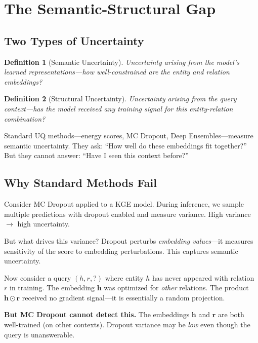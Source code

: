 \documentclass{article}
\newtheorem{definition}{Definition}
\begin{document}
\section{The Semantic-Structural Gap}
\label{sec:gap}

\subsection{Two Types of Uncertainty}

\begin{definition}[Semantic Uncertainty]
Uncertainty arising from the model's learned representations---how well-constrained are the entity and relation embeddings?
\end{definition}

\begin{definition}[Structural Uncertainty]
Uncertainty arising from the query context---has the model received \emph{any} training signal for this entity-relation combination?
\end{definition}

Standard UQ methods---energy scores, MC Dropout, Deep Ensembles---measure semantic uncertainty. They ask: ``How well do these embeddings fit together?'' But they cannot answer: ``Have I seen this context before?''

\subsection{Why Standard Methods Fail}

Consider MC Dropout applied to a KGE model. During inference, we sample multiple predictions with dropout enabled and measure variance. High variance $\rightarrow$ high uncertainty.

But what drives this variance? Dropout perturbs \emph{embedding values}---it measures sensitivity of the score to embedding perturbations. This captures semantic uncertainty.

Now consider a query $(h, r, ?)$ where entity $h$ has never appeared with relation $r$ in training. The embedding $\mathbf{h}$ was optimized for \emph{other} relations. The product $\mathbf{h} \odot \mathbf{r}$ received no gradient signal---it is essentially a random projection.

\textbf{But MC Dropout cannot detect this.} The embeddings $\mathbf{h}$ and $\mathbf{r}$ are both well-trained (on other contexts). Dropout variance may be \emph{low} even though the query is unanswerable.
\end{document}
